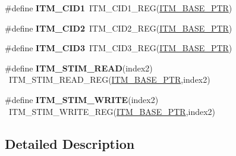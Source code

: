 \begin{DoxyCompactItemize}
\item 
\hypertarget{group___i_t_m___register___accessor___macros_gaf50cb2dc3f9b8bffc86c7996aecd1317}{}\#define {\bfseries I\+T\+M\+\_\+\+C\+I\+D1}~I\+T\+M\+\_\+\+C\+I\+D1\+\_\+\+R\+E\+G(\hyperlink{group___i_t_m___peripheral_gafaddee8fe8b6a898d4e5edc43ee0d703}{I\+T\+M\+\_\+\+B\+A\+S\+E\+\_\+\+P\+T\+R})\label{group___i_t_m___register___accessor___macros_gaf50cb2dc3f9b8bffc86c7996aecd1317}

\item 
\hypertarget{group___i_t_m___register___accessor___macros_ga5784d4cd48cfb3eec14ec2ebcb21b479}{}\#define {\bfseries I\+T\+M\+\_\+\+C\+I\+D2}~I\+T\+M\+\_\+\+C\+I\+D2\+\_\+\+R\+E\+G(\hyperlink{group___i_t_m___peripheral_gafaddee8fe8b6a898d4e5edc43ee0d703}{I\+T\+M\+\_\+\+B\+A\+S\+E\+\_\+\+P\+T\+R})\label{group___i_t_m___register___accessor___macros_ga5784d4cd48cfb3eec14ec2ebcb21b479}

\item 
\hypertarget{group___i_t_m___register___accessor___macros_gafee293421dbce031defe620ccbeded36}{}\#define {\bfseries I\+T\+M\+\_\+\+C\+I\+D3}~I\+T\+M\+\_\+\+C\+I\+D3\+\_\+\+R\+E\+G(\hyperlink{group___i_t_m___peripheral_gafaddee8fe8b6a898d4e5edc43ee0d703}{I\+T\+M\+\_\+\+B\+A\+S\+E\+\_\+\+P\+T\+R})\label{group___i_t_m___register___accessor___macros_gafee293421dbce031defe620ccbeded36}

\item 
\hypertarget{group___i_t_m___register___accessor___macros_gae105b314bb70bc6bba676139bf20bf4c}{}\#define {\bfseries I\+T\+M\+\_\+\+S\+T\+I\+M\+\_\+\+R\+E\+A\+D}(index2)                                    ~I\+T\+M\+\_\+\+S\+T\+I\+M\+\_\+\+R\+E\+A\+D\+\_\+\+R\+E\+G(\hyperlink{group___i_t_m___peripheral_gafaddee8fe8b6a898d4e5edc43ee0d703}{I\+T\+M\+\_\+\+B\+A\+S\+E\+\_\+\+P\+T\+R},index2)\label{group___i_t_m___register___accessor___macros_gae105b314bb70bc6bba676139bf20bf4c}

\item 
\hypertarget{group___i_t_m___register___accessor___macros_gacdfde2de9665a79e3097f74bd9f3ac29}{}\#define {\bfseries I\+T\+M\+\_\+\+S\+T\+I\+M\+\_\+\+W\+R\+I\+T\+E}(index2)                                  ~I\+T\+M\+\_\+\+S\+T\+I\+M\+\_\+\+W\+R\+I\+T\+E\+\_\+\+R\+E\+G(\hyperlink{group___i_t_m___peripheral_gafaddee8fe8b6a898d4e5edc43ee0d703}{I\+T\+M\+\_\+\+B\+A\+S\+E\+\_\+\+P\+T\+R},index2)\label{group___i_t_m___register___accessor___macros_gacdfde2de9665a79e3097f74bd9f3ac29}

\end{DoxyCompactItemize}


\subsection{Detailed Description}
